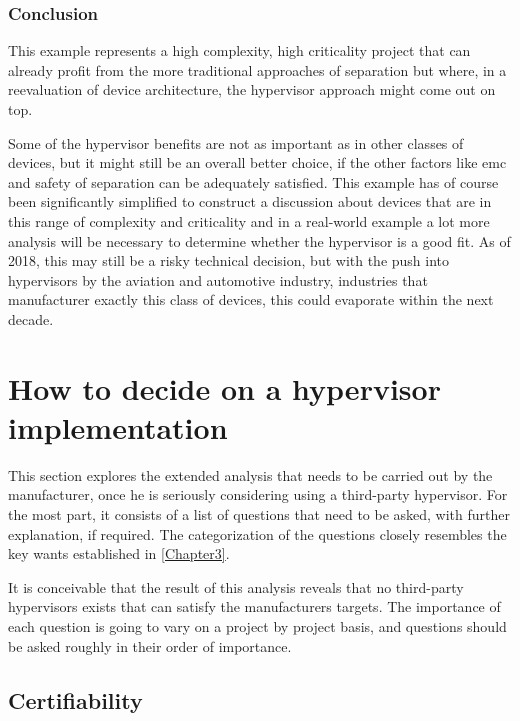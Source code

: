 \subsubsection{Conclusion}
This example represents a high complexity, high criticality project that can already profit from the more traditional approaches of separation but where, in a reevaluation of device architecture, the hypervisor approach might come out on top. 

Some of the hypervisor benefits are not as important as in other classes of devices, but it might still be an overall better choice, if the other factors like \acrshort{emc} and safety of separation can be adequately satisfied. This example has of course been significantly simplified to construct a discussion about devices that are in this range of complexity and criticality and in a real-world example a lot more analysis will be necessary to determine whether the hypervisor is a good fit. As of 2018, this may still be a risky technical decision, but with the push into hypervisors by the aviation and automotive industry, industries that manufacturer exactly this class of devices, this could evaporate within the next decade.


\section{How to decide on a hypervisor implementation} \label{how-to-decide}
This section explores the extended analysis that needs to be carried out by the manufacturer, once he is seriously considering using a third-party hypervisor. For the most part, it consists of a list of questions that need to be asked, with further explanation, if required. The categorization of the questions closely resembles the key wants established in \ref{Chapter3}.

It is conceivable that the result of this analysis reveals that no third-party hypervisors exists that can satisfy the manufacturers targets. The importance of each question is going to vary on a project by project basis, and questions should be asked roughly in their order of importance. 

\subsection{Certifiability}

